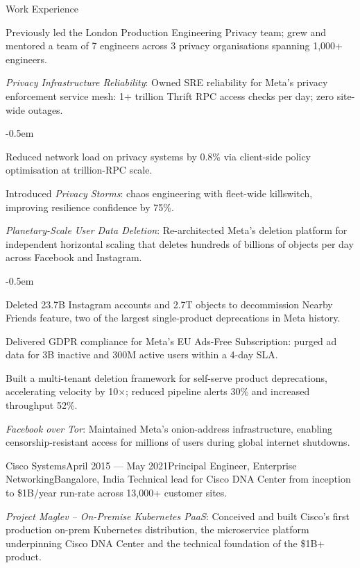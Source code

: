 \documentclass{resume}
\begin{document}
\begin{rSection}{Work Experience}
\begin{rSubsection}{}{}{}{}{Previously led the London Production Engineering Privacy team; grew and mentored a team of 7 engineers across 3 privacy organisations spanning 1,000+ engineers.}
\item {\em Privacy Infrastructure Reliability}:
Owned SRE reliability for Meta's privacy enforcement service mesh: 1+ trillion Thrift RPC access checks per day; zero site-wide outages.

\begin{itemize}
\renewcommand\labelitemi{--}
{\small
\itemsep -0.5em
\item Reduced network load on privacy systems by 0.8\% via client-side policy optimisation at trillion-RPC scale.
\item Introduced \textit{Privacy Storms}: chaos engineering with fleet-wide killswitch, improving resilience confidence by 75\%.
}
\end{itemize}

\item {\em Planetary-Scale User Data Deletion}:
Re-architected Meta's deletion platform for independent horizontal scaling that deletes hundreds of billions of objects per day across Facebook and Instagram.

\begin{itemize}
\renewcommand\labelitemi{--}
{\small
\itemsep -0.5em
\item Deleted 23.7B Instagram accounts and 2.7T objects to decommission Nearby Friends feature, two of the largest single-product deprecations in Meta history.
\item Delivered GDPR compliance for Meta's EU Ads-Free Subscription: purged ad data for 3B inactive and 300M active users within a 4-day SLA.
\item Built a multi-tenant deletion framework for self-serve product deprecations, accelerating velocity by 10$\times$; reduced pipeline alerts 30\% and increased throughput 52\%.
}
\end{itemize}

\item {\em Facebook over Tor}: Maintained Meta's onion-address infrastructure, enabling censorship-resistant access for millions of users during global internet shutdowns.

\end{rSubsection}

\begin{rSubsection}{Cisco Systems}{April 2015 --- May 2021}{Principal Engineer, Enterprise Networking}{Bangalore, India}
{Technical lead for Cisco DNA Center from inception to \$1B/year run-rate across 13,000+ customer sites.}

\item {\em Project Maglev -- On-Premise Kubernetes PaaS}:
Conceived and built Cisco's first production on-prem Kubernetes distribution, the microservice platform underpinning Cisco DNA Center and the technical foundation of the \$1B+ product.


\end{rSubsection}
\end{rSection}
\end{document}
